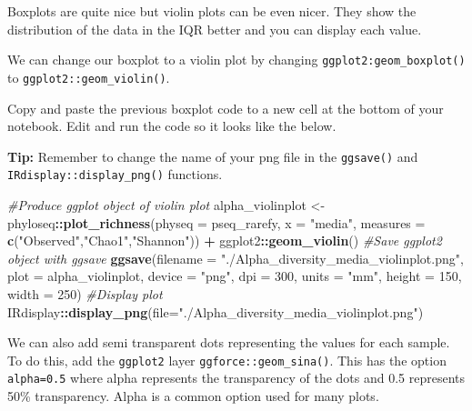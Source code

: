 \documentclass[
]{book}
\newenvironment{Shaded}{\begin{snugshade}}{\end{snugshade}}
\newcommand{\AttributeTok}[1]{\textcolor[rgb]{0.13,0.29,0.53}{#1}}
\newcommand{\CommentTok}[1]{\textcolor[rgb]{0.56,0.35,0.01}{\textit{#1}}}
\newcommand{\DecValTok}[1]{\textcolor[rgb]{0.00,0.00,0.81}{#1}}
\newcommand{\FunctionTok}[1]{\textcolor[rgb]{0.13,0.29,0.53}{\textbf{#1}}}
\newcommand{\NormalTok}[1]{#1}
\newcommand{\OtherTok}[1]{\textcolor[rgb]{0.56,0.35,0.01}{#1}}
\newcommand{\SpecialCharTok}[1]{\textcolor[rgb]{0.81,0.36,0.00}{\textbf{#1}}}
\newcommand{\StringTok}[1]{\textcolor[rgb]{0.31,0.60,0.02}{#1}}
\begin{document}
Boxplots are quite nice but violin plots can be even nicer.
They show the distribution of the data in the IQR better and you can display each value.

We can change our boxplot to a violin plot by changing \texttt{ggplot2:geom\_boxplot()} to \texttt{ggplot2::geom\_violin()}.

Copy and paste the previous boxplot code to a new cell at the bottom of your notebook.
Edit and run the code so it looks like the below.

\textbf{Tip:} Remember to change the name of your png file in the \texttt{ggsave()} and \texttt{IRdisplay::display\_png()} functions.

\begin{Shaded}
\begin{Highlighting}[]
\CommentTok{\#Produce ggplot object of violin plot}
\NormalTok{alpha\_violinplot }\OtherTok{\textless{}{-}}\NormalTok{ phyloseq}\SpecialCharTok{::}\FunctionTok{plot\_richness}\NormalTok{(}\AttributeTok{physeq =}\NormalTok{ pseq\_rarefy, }
                        \AttributeTok{x =} \StringTok{"media"}\NormalTok{,}
                        \AttributeTok{measures =} \FunctionTok{c}\NormalTok{(}\StringTok{"Observed"}\NormalTok{,}\StringTok{"Chao1"}\NormalTok{,}\StringTok{"Shannon"}\NormalTok{)) }\SpecialCharTok{+}
\NormalTok{                          ggplot2}\SpecialCharTok{::}\FunctionTok{geom\_violin}\NormalTok{()}
\CommentTok{\#Save ggplot2 object with ggsave}
\FunctionTok{ggsave}\NormalTok{(}\AttributeTok{filename =} \StringTok{"./Alpha\_diversity\_media\_violinplot.png"}\NormalTok{, }\AttributeTok{plot =}\NormalTok{ alpha\_violinplot,}
       \AttributeTok{device =} \StringTok{"png"}\NormalTok{, }\AttributeTok{dpi =} \DecValTok{300}\NormalTok{, }\AttributeTok{units =} \StringTok{"mm"}\NormalTok{, }\AttributeTok{height =} \DecValTok{150}\NormalTok{, }\AttributeTok{width =} \DecValTok{250}\NormalTok{)}
\CommentTok{\#Display plot}
\NormalTok{IRdisplay}\SpecialCharTok{::}\FunctionTok{display\_png}\NormalTok{(}\AttributeTok{file=}\StringTok{"./Alpha\_diversity\_media\_violinplot.png"}\NormalTok{)}
\end{Highlighting}
\end{Shaded}

We can also add semi transparent dots representing the values for each sample.
To do this, add the \texttt{ggplot2} layer \texttt{ggforce::geom\_sina()}.
This has the option \texttt{alpha=0.5} where alpha represents the transparency of the dots and 0.5 represents 50\% transparency.
Alpha is a common option used for many plots.
\end{document}
